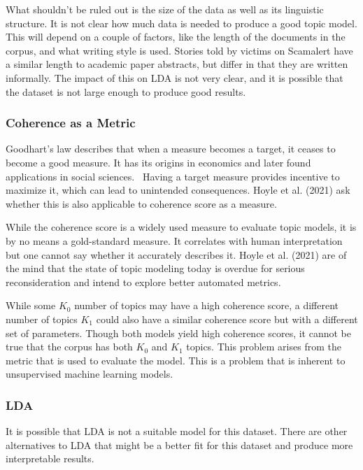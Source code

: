 What shouldn't be ruled out is the size of the data as well as its linguistic structure. It is not clear how much data is needed to produce a good topic model. This will depend on a couple of factors, like the length of the documents in the corpus, and what writing style is used. Stories told by victims on Scamalert have a similar length to academic paper abstracts, but differ in that they are written informally. The impact of this on LDA is not very clear, and it is possible that the dataset is not large enough to produce good results.

\subsubsection*{Coherence as a Metric}

Goodhart's law describes that when a measure becomes a target, it ceases to become a good measure. It has its origins in economics and later found applications in social sciences.~\cite{strathern1997improving}\cite{goodhart2015goodhart} Having a target measure provides incentive to maximize it, which can lead to unintended consequences. Hoyle et al. (2021) ask whether this is also applicable to coherence score as a measure.~\cite{hoyle2021automated}

While the coherence score is a widely used measure to evaluate topic models, it is by no means a gold-standard measure. It correlates with human interpretation but one cannot say whether it accurately describes it. Hoyle et al. (2021) are of the mind that the state of topic modeling today is overdue for serious reconsideration and intend to explore better automated metrics.~\cite{hoyle2021automated}

While some $K_0$ number of topics may have a high coherence score, a different number of topics $K_1$ could also have a similar coherence score but with a different set of parameters. Though both models yield high coherence scores, it cannot be true that the corpus has both $K_0$ and $K_1$ topics. This problem arises from the metric that is used to evaluate the model. This is a problem that is inherent to unsupervised machine learning models.


\subsubsection*{LDA}

It is possible that LDA is not a suitable model for this dataset. There are other alternatives to LDA that might be a better fit for this dataset and produce more interpretable results.

